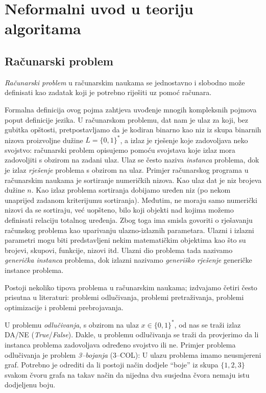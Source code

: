 \chapter{Neformalni uvod u teoriju algoritama}

\section{Računarski problem}

\textit{Računarski problem} u računarskim naukama se jednostavno i slobodno može definisati kao zadatak koji je potrebno riješiti uz pomoć računara. 

Formalna definicija ovog pojma zahtjeva uvođenje mnogih kompleksnih pojmova poput definicije jezika.  U računarskom problemu, dat nam je ulaz za koji, bez gubitka opštosti, pretpostavljamo da je kodiran  binarno kao niz iz skupa binarnih nizova proizvoljne dužine $L=\{0, 1\}^*$, a  izlaz je 
rješenje koje zadovoljava neko svojstvo: računarski problem    opisujemo  pomoću svojstava koje izlaz mora zadovoljiti s obzirom na zadani ulaz. Ulaz se često naziva \textit{instanca} problema, dok je izlaz \textit{rješenje} problema s obzirom na ulaz. Primjer računarskog programa u računarskim naukama je sortiranje numeričkih nizova. Kao ulaz dat je niz brojeva dužine $n$. Kao izlaz problema sortiranja dobijamo uređen niz (po nekom unaprijed zadanom kriterijumu sortiranja). Međutim, ne moraju samo numerički nizovi da se sortiraju, već uopšteno, bilo koji objekti nad kojima možemo definisati relaciju totalnog uređenja. Zbog toga ima smisla govoriti o rješavanju računskog problema kao 
 uparivanju ulazno-izlaznih parametara. Ulazni i izlazni parametri mogu biti predstavljeni nekim matematičkim objektima kao što su brojevi, skupovi, funkcije, nizovi itd. Ulazni dio problema tada nazivamo \textit{generička instanca} problema, dok izlazni nazivamo  \textit{generiško rješenje} generičke instance problema. 
 
 Postoji nekoliko tipova problema u računarskim naukama; izdvajamo četiri često prisutna u literaturi: problemi odlučivanja, problemi pretraživanja, problemi optimizacije i problemi prebrojavanja. 
 
 U problemu \textit{odlučivanja}, s obzirom na ulaz $x \in \{0, 1\}^*$, od nas se traži izlaz DA/NE (\emph{True}/\emph{False}). Dakle, u problemu odlučivanja se traži da provjerimo da li instanca problema zadovoljava određeno svojstvo ili ne. Primjer problema odlučivanja je problem \textit{3--bojanja} (3--COL):
 U ulazu problema imamo neusmjereni graf. Potrebno je odrediti da li postoji način dodjele   ``boje''  iz skupa $\{1, 2, 3\}$ svakom čvoru grafa na takav način da nijedna dva susjedna čvora nemaju istu dodjeljenu boju.
 
